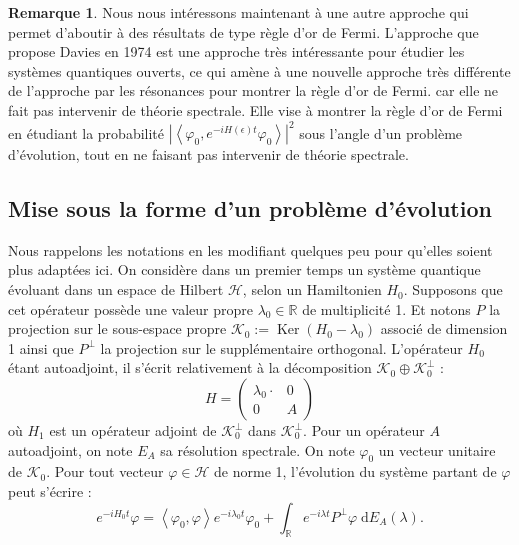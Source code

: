 \documentclass[12pt,openany,a4paper, titlepage]{article}
\newcommand{\lp}{\left(}
\newcommand{\rp}{\right)}
\newcommand{\la}{\left\langle}
\newcommand{\ra}{\right\rangle}
\newcommand{\dd}{\;\mathrm{d}}
\newcommand{\R}{\mathbb{R}}
\newcommand{\vp}{\varphi}
\newcommand{\St}[2]{e^{-i #1 #2}}
\newcommand{\ortho}{P^\perp}
\newcommand{\Ker}{\operatorname{Ker}}
\theoremstyle{definition}
\theoremstyle{definition}
\theoremstyle{definition}
\theoremstyle{definition}
\theoremstyle{definition}
\newtheorem{rem}{Remarque}
\theoremstyle{definition}
\begin{document}
\begin{rem}
Nous nous intéressons maintenant à une autre approche qui permet d'aboutir à des résultats de type règle d'or de Fermi. L'approche que propose Davies \cite{davies} en 1974 est une approche très intéressante pour étudier les systèmes quantiques ouverts, ce qui amène à une nouvelle approche très différente de l'approche par les résonances pour montrer la règle d'or de Fermi. car elle ne fait pas intervenir de théorie spectrale. Elle vise à montrer la règle d'or de Fermi en étudiant la probabilité $\left|\la \vp_0 , e^{-iH(\epsilon) t} \vp_0\ra\right|^2$ sous l'angle d'un problème d'évolution, tout en ne faisant pas intervenir de théorie spectrale.  

\subsection{Mise sous la forme d'un problème d'évolution}

Nous rappelons les notations en les modifiant quelques peu pour qu'elles soient plus adaptées ici. On considère dans un premier temps un système quantique évoluant dans un espace de Hilbert $\mathcal{H}$, selon un Hamiltonien $H_0$. Supposons que cet opérateur possède une valeur propre $\lambda_0 \in \R$ de multiplicité 1. Et notons $P$ la projection sur le sous-espace propre $\mathcal{K}_0 := \Ker\lp H_0 -\lambda_0\rp$ associé de dimension 1 ainsi que $\ortho$ la projection sur le supplémentaire orthogonal. L'opérateur $H_0$ étant autoadjoint, il s'écrit relativement à la décomposition $\mathcal{K}_0\oplus \mathcal{K}_0^\perp$ :
\begin{equation}
    H = \begin{pmatrix}
    \lambda_0 \cdot & 0 \\
    0 & A
\end{pmatrix}
\end{equation}
où $H_1$ est un opérateur adjoint de $\mathcal{K}_0^\perp$ dans $\mathcal{K}_0^\perp$. Pour un opérateur $A$ autoadjoint, on note $E_A$ sa résolution spectrale. On note $\vp_0$ un vecteur unitaire de $\mathcal{K}_0$. Pour tout vecteur $\varphi \in \mathcal{H}$ de norme 1, l'évolution du système partant de $\varphi$ peut s'écrire :
\begin{equation}
    \St{H_0}{t}\varphi = \la \vp_0, \varphi \ra \St{\lambda_0}{t} \vp_0 + \int_\R \St{\lambda}{t}\ortho \varphi \dd E_{A}(\lambda).
\end{equation}


\end{rem}
\end{document}
